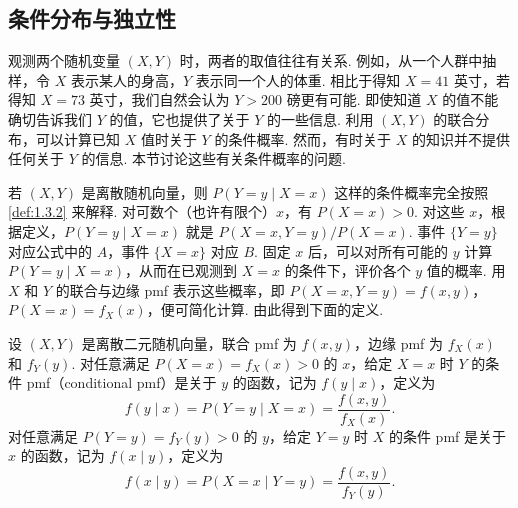 \subsection{条件分布与独立性}\label{sec:4.2}
观测两个随机变量 $(X,Y)$ 时，两者的取值往往有关系. 例如，从一个人群中抽样，令 $X$ 表示某人的身高，$Y$ 表示同一个人的体重. 相比于得知 $X=41$ 英寸，若得知 $X=73$ 英寸，我们自然会认为 $Y>200$ 磅更有可能. 即使知道 $X$ 的值不能确切告诉我们 $Y$ 的值，它也提供了关于 $Y$ 的一些信息. 利用 $(X,Y)$ 的联合分布，可以计算已知 $X$ 值时关于 $Y$ 的条件概率. 然而，有时关于 $X$ 的知识并不提供任何关于 $Y$ 的信息. 本节讨论这些有关条件概率的问题.

若 $(X,Y)$ 是离散随机向量，则 $P(Y=y\mid X=x)$ 这样的条件概率完全按照\autoref{def:1.3.2} 来解释. 对可数个（也许有限个）$x$，有 $P(X=x)>0$. 对这些 $x$，根据定义，$P(Y=y\mid X=x)$ 就是 $P(X=x,Y=y)/P(X=x)$. 事件 $\{Y=y\}$ 对应公式中的 $A$，事件 $\{X=x\}$ 对应 $B$. 固定 $x$ 后，可以对所有可能的 $y$ 计算 $P(Y=y\mid X=x)$，从而在已观测到 $X=x$ 的条件下，评价各个 $y$ 值的概率. 用 $X$ 和 $Y$ 的联合与边缘 pmf 表示这些概率，即 $P(X=x,Y=y)=f(x,y)$，$P(X=x)=f_X(x)$，便可简化计算. 由此得到下面的定义.
\begin{definition}\label{def:4.2.1}
设 $(X,Y)$ 是离散二元随机向量，联合 pmf 为 $f(x,y)$，边缘 pmf 为 $f_X(x)$ 和 $f_Y(y)$. 对任意满足 $P(X=x)=f_X(x)>0$ 的 $x$，给定 $X=x$ 时 $Y$ 的条件 pmf（conditional pmf）是关于 $y$ 的函数，记为 $f(y\mid x)$，定义为
$$f(y\mid x)=P(Y=y\mid X=x)=\frac{f(x,y)}{f_X(x)}.$$
对任意满足 $P(Y=y)=f_Y(y)>0$ 的 $y$，给定 $Y=y$ 时 $X$ 的条件 pmf 是关于 $x$ 的函数，记为 $f(x\mid y)$，定义为
$$f(x\mid y)=P(X=x\mid Y=y)=\frac{f(x,y)}{f_Y(y)}.$$
\end{definition}

